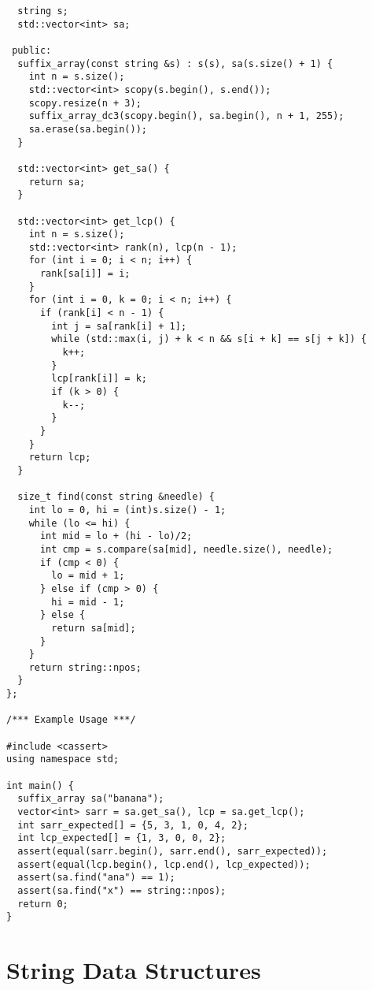\begin{lstlisting}
  string s;
  std::vector<int> sa;

 public:
  suffix_array(const string &s) : s(s), sa(s.size() + 1) {
    int n = s.size();
    std::vector<int> scopy(s.begin(), s.end());
    scopy.resize(n + 3);
    suffix_array_dc3(scopy.begin(), sa.begin(), n + 1, 255);
    sa.erase(sa.begin());
  }

  std::vector<int> get_sa() {
    return sa;
  }

  std::vector<int> get_lcp() {
    int n = s.size();
    std::vector<int> rank(n), lcp(n - 1);
    for (int i = 0; i < n; i++) {
      rank[sa[i]] = i;
    }
    for (int i = 0, k = 0; i < n; i++) {
      if (rank[i] < n - 1) {
        int j = sa[rank[i] + 1];
        while (std::max(i, j) + k < n && s[i + k] == s[j + k]) {
          k++;
        }
        lcp[rank[i]] = k;
        if (k > 0) {
          k--;
        }
      }
    }
    return lcp;
  }

  size_t find(const string &needle) {
    int lo = 0, hi = (int)s.size() - 1;
    while (lo <= hi) {
      int mid = lo + (hi - lo)/2;
      int cmp = s.compare(sa[mid], needle.size(), needle);
      if (cmp < 0) {
        lo = mid + 1;
      } else if (cmp > 0) {
        hi = mid - 1;
      } else {
        return sa[mid];
      }
    }
    return string::npos;
  }
};

/*** Example Usage ***/

#include <cassert>
using namespace std;

int main() {
  suffix_array sa("banana");
  vector<int> sarr = sa.get_sa(), lcp = sa.get_lcp();
  int sarr_expected[] = {5, 3, 1, 0, 4, 2};
  int lcp_expected[] = {1, 3, 0, 0, 2};
  assert(equal(sarr.begin(), sarr.end(), sarr_expected));
  assert(equal(lcp.begin(), lcp.end(), lcp_expected));
  assert(sa.find("ana") == 1);
  assert(sa.find("x") == string::npos);
  return 0;
}
\end{lstlisting}

\section{String Data Structures}
\setcounter{section}{6}
\setcounter{subsection}{0}
